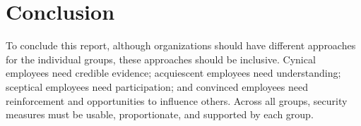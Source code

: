 \documentclass[12pt]{article}
\begin{document}
\section{Conclusion}
To conclude this report, although organizations should have different approaches for the individual groups, these approaches should be inclusive. Cynical employees need credible evidence; acquiescent employees need understanding; sceptical employees need participation; and convinced employees need reinforcement and opportunities to influence others. Across all groups, security measures must be usable, proportionate, and supported by each group. 



\end{document}

